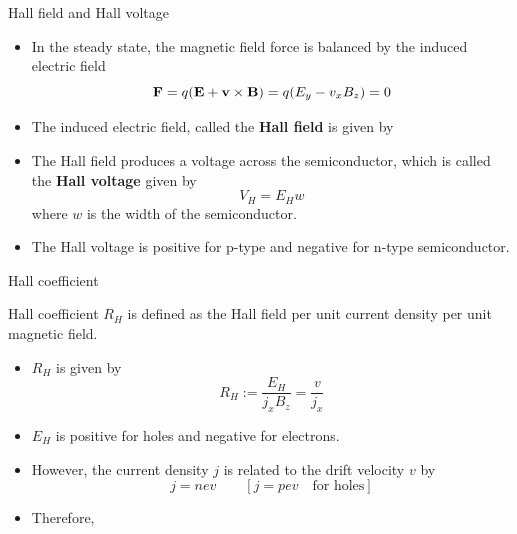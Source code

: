 %
\begin{frame}{Hall field and Hall voltage}
	\begin{itemize}
		\item In the steady state, the magnetic field force is balanced by the induced electric field
		\[
		\vb{F} = q(\vb{E} + \vb{v} \times \vb{B}) = q(E_y - v_x B_z) = 0
		\]
		\item The induced electric field, called the \textbf{Hall field} is given by
		\begin{center}
		\end{center}
		\item The Hall field produces a voltage across the semiconductor, which is called the \textbf{Hall voltage} given by
		\[
		V_H = E_H w
		\]
		where \(w\) is the width of the semiconductor.
		\item The Hall voltage is positive for p-type and negative for n-type semiconductor.
	\end{itemize}
\end{frame}
%
\begin{frame}{Hall coefficient}
	\begin{definition}
		Hall coefficient \(R_H\) is defined as the Hall field per unit current density per unit magnetic field.
	\end{definition}
	\begin{itemize}
		\item \(R_H\) is given by
		\[
			R_H := \frac{E_H}{j_x B_z} = \frac{v}{j_x}
		\]
		\item \(E_H\) is positive for holes and negative for electrons.
		\item However, the current density \(j\) is related to the drift velocity \(v\) by
		\[
		j = n e v \qquad [ j = p e v \quad \text{for holes}]
		\]
		\item Therefore,
\begin{center}
\end{center}

	\end{itemize}
\end{frame}
%
%
